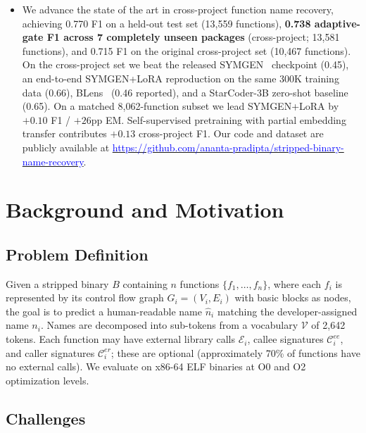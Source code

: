 \documentclass[sigconf,nonacm]{acmart}
\begin{document}
\begin{itemize}
    \item We advance the state of the art in cross-project function name recovery, achieving 0.770 F1 on a held-out test set (13{,}559 functions), \textbf{0.738 adaptive-gate F1 across 7 completely unseen packages} (cross-project; 13{,}581 functions), and 0.715 F1 on the original cross-project set (10{,}467 functions). On the cross-project set we beat the released SYMGEN~\cite{symgen} checkpoint (0.45), an end-to-end SYMGEN+LoRA reproduction on the same 300K training data (0.66), BLens~\cite{blens} (0.46 reported), and a StarCoder-3B zero-shot baseline (0.65). On a matched 8{,}062-function subset we lead SYMGEN+LoRA by $+0.10$ F1 / $+26$pp EM. Self-supervised pretraining with partial embedding transfer contributes $+0.13$ cross-project F1. Our code and dataset are publicly available at \href{https://github.com/ananta-pradipta/stripped-binary-name-recovery}{\textcolor{blue}{https://github.com/\allowbreak{}ananta-pradipta/\allowbreak{}stripped-binary-name-recovery}}.
\end{itemize}

\section{Background and Motivation}
\label{sec:background}

\subsection{Problem Definition}
\label{sec:problem}

Given a stripped binary $B$ containing $n$ functions $\{f_1, \ldots, f_n\}$, where each $f_i$ is represented by its control flow graph $G_i = (V_i, E_i)$ with basic blocks as nodes, the goal is to predict a human-readable name $\hat{n}_i$ matching the developer-assigned name $n_i$. Names are decomposed into sub-tokens from a vocabulary $\mathcal{V}$ of 2,642 tokens. Each function may have external library calls $\mathcal{E}_i$, callee signatures $\mathcal{C}_i^{ee}$, and caller signatures $\mathcal{C}_i^{er}$; these are optional (approximately 70\% of functions have no external calls). We evaluate on x86-64 ELF binaries at O0 and O2 optimization levels.

\subsection{Challenges}
\label{sec:challenges}
\end{document}
